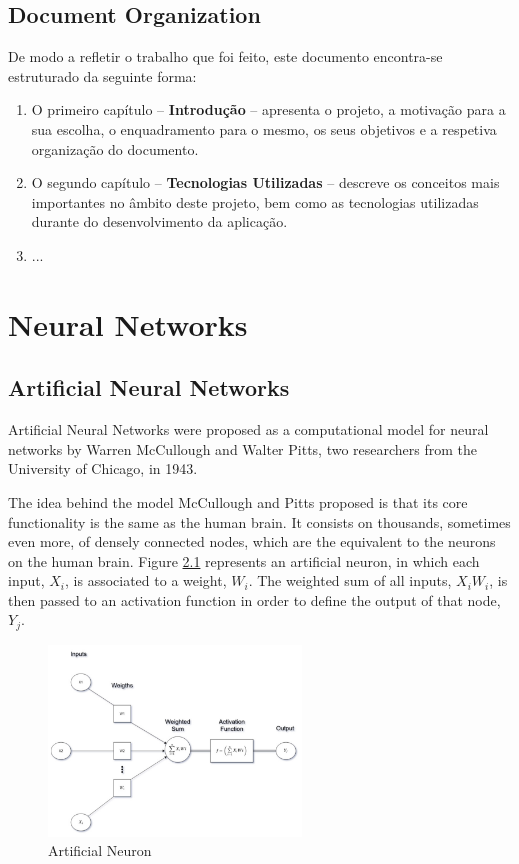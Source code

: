 \documentclass[12pt,a4paper,oneside]{memoir}
\begin{document}
\section{Document Organization}
\label{sec:organ}
De modo a refletir o trabalho que foi feito, este documento encontra-se estruturado da seguinte forma:
\begin{enumerate}
\item O primeiro capítulo -- \textbf{Introdução} -- apresenta o projeto, a motivação para a sua escolha, o enquadramento para o mesmo, os seus objetivos e a respetiva organização do documento.
\item O segundo capítulo -- \textbf{Tecnologias Utilizadas} -- descreve os conceitos mais importantes no âmbito deste projeto, bem como as tecnologias utilizadas durante do desenvolvimento da aplicação.
\item ...
\end{enumerate}



\clearpage{\thispagestyle{empty}\cleardoublepage}

\chapter{Neural Networks}
\label{chap:nn}


\section{Artificial Neural Networks}


Artificial Neural Networks were proposed as a computational model for neural networks by Warren McCullough and Walter Pitts, two researchers from the University of Chicago, in 1943.

The idea behind the model McCullough and Pitts proposed is that its core functionality is the same as the human brain. It consists on thousands, sometimes even more, of densely connected nodes, which are the equivalent to the neurons on the human brain. Figure \ref{fig:neuron} represents an artificial neuron, in which each input, $X_{i}$, is associated to a weight, $W_{i}$. The weighted sum of all inputs, $ X_{i}W_{i}$, is then passed to an activation function in order to define the output of that node, $Y_{j}$. %


\begin{figure}[H]
\centering
\includegraphics[width=0.6\textwidth]{images/Neuron.jpg}
\caption{Artificial Neuron}
\centering
\label{fig:neuron}
\end{figure}
\end{document}
